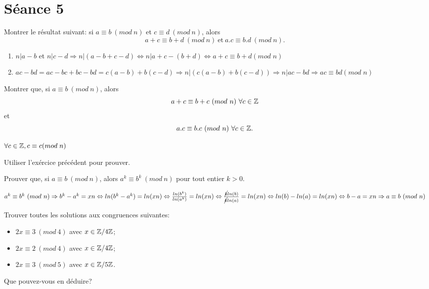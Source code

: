 
\section{Séance 5}

\begin{exo}
Montrer le r\'esultat suivant: si $a\equiv b ~(mod~n)$ et $c\equiv d ~(mod~n)$, alors
$$ a+c \equiv b+d ~(mod~n) ~\mathrm{et}~ a.c \equiv b.d ~(mod~n).$$
\end{exo}

\begin{enumerate}[$\cdot$]
\item $n|a-b$ et $n|c-d \Rightarrow n|(a-b+c-d) \Leftrightarrow n|a+c-(b+d) \Leftrightarrow a+c \equiv b+d(mod\;n)$ 
\item $ac-bd = ac-bc+bc-bd = c(a-b) + b(c-d) \Rightarrow n|(c(a-b)+b(c-d)) \Rightarrow n|ac-bd \Rightarrow ac \equiv bd(mod\;n)$  
\end{enumerate}


\vspace*{0.8cm}
\begin{exo}
Montrer que, si $a\equiv b ~(mod~n)$, alors $$a+c\equiv b+c ~(mod~n) ~\forall c \in \mathbb{Z}$$ et $$a.c\equiv b.c ~(mod~n) ~\forall c \in \mathbb{Z}.$$ 
\end{exo}

$\forall c \in \mathbb{Z}, c \equiv c(mod\;n)$

Utiliser l'exércice précédent pour prouver.


\vspace*{0.8cm}
\begin{exo}
Prouver que, si $a\equiv b ~(mod~n)$, alors $a^k\equiv b^k ~(mod~n)$ pour tout entier $k>0$.
\end{exo}

$a^{k}\equiv b^{k} ~(mod~n) \Rightarrow b^{k} - a^{k} = xn \Leftrightarrow ln(b^{k} - a^{k}) = ln(xn) \Leftrightarrow \frac{ln(b^{k})}{ln(a^k)} = ln(xn) \Leftrightarrow \frac{\cancel{k}ln(b)}{\cancel{k}ln(a)} = ln(xn) \Leftrightarrow ln(b) - ln(a) = ln(xn) \Leftrightarrow b - a = xn \Rightarrow a\equiv b ~(mod~n)$


\vspace*{0.8cm}
\begin{exo}
Trouver toutes les solutions aux congruences suivantes:
\begin{itemize}
\item $2x \equiv 3 ~(mod~4)$ avec $x \in \mathbb{Z}/4\mathbb{Z}$;
\item $2x \equiv 2 ~(mod~4)$ avec $x \in \mathbb{Z}/4\mathbb{Z}$;
\item $2x \equiv 3 ~(mod~5)$ avec $x \in \mathbb{Z}/5\mathbb{Z}$.
\end{itemize}
Que pouvez-vous en d\'eduire?
\end{exo}

